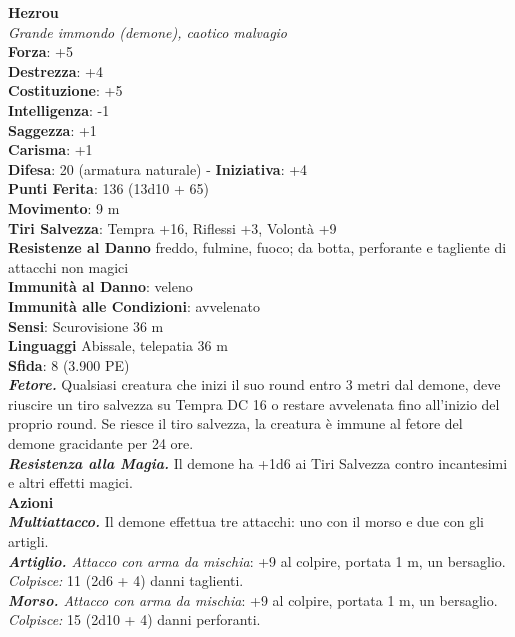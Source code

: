 \begin{multicols}{2}
\medskip\textbf{Hezrou}\\
\emph{Grande immondo (demone), caotico malvagio}\\
\textbf{Forza}: +5\\
\textbf{Destrezza}: +4\\
\textbf{Costituzione}: +5\\
\textbf{Intelligenza}: -1\\
\textbf{Saggezza}: +1\\
\textbf{Carisma}: +1\\
\textbf{Difesa}: 20 (armatura naturale) - \textbf{Iniziativa}: +4\\
\textbf{Punti Ferita}: 136 (13d10 + 65)\\
\textbf{Movimento}: 9 m\\
\textbf{Tiri Salvezza}: Tempra +16, Riflessi +3, Volontà +9\\
\textbf{Resistenze al Danno} freddo, fulmine, fuoco; da botta, perforante e tagliente di attacchi non magici\\
\textbf{Immunità al Danno}: veleno\\
\textbf{Immunità alle Condizioni}: avvelenato\\
\textbf{Sensi}: Scurovisione 36 m\\
\textbf{Linguaggi} Abissale, telepatia 36 m \\
\textbf{Sfida}: 8 (3.900 PE)\smallskip\\
\emph{\textbf{Fetore.}} Qualsiasi creatura che inizi il suo round entro 3 metri dal demone, deve riuscire un tiro salvezza su Tempra DC  16 o restare avvelenata fino all'inizio del proprio round. Se riesce il tiro salvezza, la creatura è immune al fetore del demone gracidante per 24 ore.\\
\emph{\textbf{Resistenza alla Magia.}} Il demone ha +1d6 ai Tiri Salvezza contro incantesimi e altri effetti magici.\\
\smallskip\textbf{Azioni}\\
\emph{\textbf{Multiattacco.}} Il demone effettua tre attacchi: uno con il morso e due con gli artigli.\\
\emph{\textbf{Artiglio.} Attacco con arma da mischia}: +9 al colpire, portata 1 m, un bersaglio.\\
\emph{Colpisce:} 11 (2d6 + 4) danni taglienti. \\
\emph{\textbf{Morso.} Attacco con arma da mischia}: +9 al colpire, portata 1 m, un bersaglio.\\
\emph{Colpisce:} 15 (2d10 + 4) danni perforanti.\\

\end{multicols}
